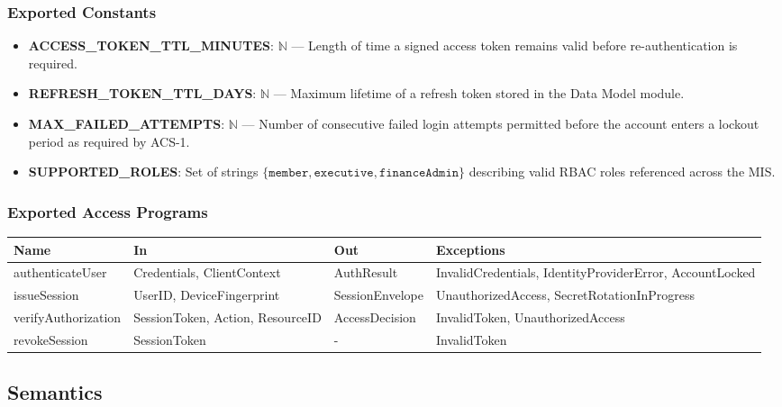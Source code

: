 \documentclass[12pt, titlepage]{article}
\begin{document}
\subsubsection{Exported Constants}

\begin{itemize}
  \item \textbf{ACCESS\_TOKEN\_TTL\_MINUTES}: $\mathbb{N}$ --- Length of time a signed access token remains valid before re-authentication is required.
  \item \textbf{REFRESH\_TOKEN\_TTL\_DAYS}: $\mathbb{N}$ --- Maximum lifetime of a refresh token stored in the Data Model module.
  \item \textbf{MAX\_FAILED\_ATTEMPTS}: $\mathbb{N}$ --- Number of consecutive failed login attempts permitted before the account enters a lockout period as required by ACS-1.
  \item \textbf{SUPPORTED\_ROLES}: Set of strings $\{\texttt{member}, \texttt{executive}, \texttt{financeAdmin}\}$ describing valid RBAC roles referenced across the MIS.
\end{itemize}

\subsubsection{Exported Access Programs}

\begin{center}
\begin{tabular}{p{3cm} p{4.2cm} p{4.2cm} p{3cm}}
\toprule
\textbf{Name} & \textbf{In} & \textbf{Out} & \textbf{Exceptions} \\
\midrule
authenticateUser & Credentials, ClientContext & AuthResult & InvalidCredentials, IdentityProviderError, AccountLocked \\
issueSession & UserID, DeviceFingerprint & SessionEnvelope & UnauthorizedAccess, SecretRotationInProgress \\
verifyAuthorization & SessionToken, Action, ResourceID & AccessDecision & InvalidToken, UnauthorizedAccess \\
revokeSession & SessionToken & - & InvalidToken \\
\bottomrule
\end{tabular}
\end{center}

\subsection{Semantics}
\end{document}
